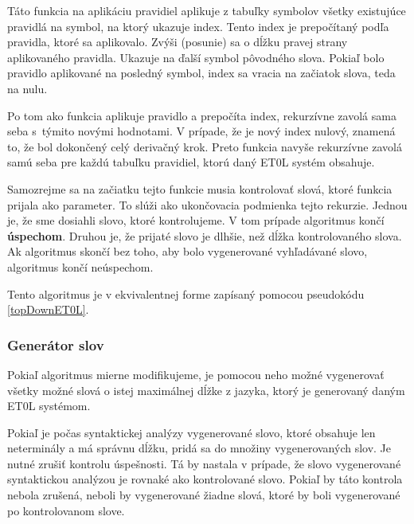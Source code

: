 Táto funkcia na aplikáciu pravidiel aplikuje z tabuľky symbolov všetky existujúce pravidlá na symbol, na ktorý ukazuje index. Tento index je prepočítaný podľa pravidla, ktoré sa aplikovalo. Zvýši (posunie) sa o dĺžku pravej strany aplikovaného pravidla. Ukazuje na ďalší symbol pôvodného slova. Pokiaľ bolo pravidlo aplikované na posledný symbol, index sa vracia na začiatok slova, teda na nulu.

Po tom ako funkcia aplikuje pravidlo a prepočíta index, rekurzívne zavolá sama seba s~týmito novými hodnotami. V prípade, že je nový index nulový, znamená to, že bol dokončený celý derivačný krok. Preto funkcia navyše rekurzívne zavolá samú seba pre každú tabuľku pravidiel, ktorú daný ET0L systém obsahuje.

Samozrejme sa na začiatku tejto funkcie musia kontrolovať slová, ktoré funkcia prijala ako parameter. To slúži ako ukončovacia podmienka tejto rekurzie. Jednou je, že sme dosiahli slovo, ktoré kontrolujeme. V tom prípade algoritmus končí \textbf{úspechom}. Druhou je, že prijaté slovo je dlhšie, než dĺžka kontrolovaného slova. Ak algoritmus skončí bez toho, aby bolo vygenerované vyhľadávané slovo, algoritmus končí neúspechom.

Tento algoritmus je v ekvivalentnej forme zapísaný pomocou pseudokódu \ref{topDownET0L}.

\subsubsection*{Generátor slov}
Pokiaľ algoritmus mierne modifikujeme, je pomocou neho možné vygenerovať všetky možné slová o istej maximálnej dĺžke z jazyka, ktorý je generovaný daným ET0L systémom.

Pokiaľ je počas syntaktickej analýzy vygenerované slovo, ktoré obsahuje len neterminály a má správnu dĺžku, pridá sa do množiny vygenerovaných slov. Je nutné zrušiť kontrolu úspešnosti. Tá by nastala v prípade, že slovo vygenerované syntaktickou analýzou je rovnaké ako kontrolované slovo. Pokiaľ by táto kontrola nebola zrušená, neboli by vygenerované žiadne slová, ktoré by boli vygenerované po kontrolovanom slove.


